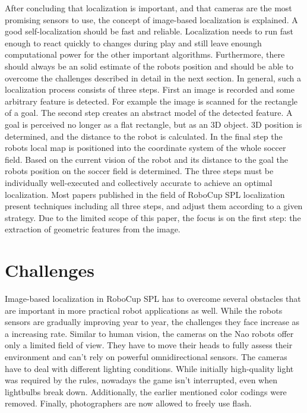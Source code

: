 \documentclass[12pt, a4paper, doc]{apa6}
\begin{document}
  After concluding that localization is important, and that cameras are the most promising sensors to use, the concept of image-based localization is explained. A good self-localization should be fast and reliable. Localization needs to run fast enough to react quickly to changes during play and still leave enoungh computational power for the other important algorithms. Furthermore, there should always be an solid estimate of the robots position and should be able to overcome the challenges described in detail in the next section. In general, such a localization process consists of three steps. First an image is recorded and some arbitrary feature is detected. For example the image is scanned for the rectangle of a goal. The second step creates an abstract model of the detected feature. A goal is perceived no longer as a flat rectangle, but as an 3D object. 3D position is determined, and the distance to the robot is calculated. In the final step the robots local map is positioned into the coordinate system of the whole soccer field. Based on the current vision of the robot and its distance to the goal the robots position on the soccer field is determined. The three steps must be individually well-executed and collectively accurate to achieve an optimal localization. Most papers published in the field of RoboCup SPL localization present techniques including all three steps, and adjust them according to a given strategy. Due to the limited scope of this paper, the focus is on the first step: the extraction of geometric features from the image.

  \section{Challenges}
  Image-based localization in RoboCup SPL has to overcome several obstacles that are important in more practical robot applications as well. While the robots sensors are gradually improving year to year, the challenges they face increase as a increasing rate. Similar to human vision, the cameras on the Nao robots offer only a limited field of view. They have to move their heads to fully assess their environment and can't rely on powerful omnidirectional sensors. The cameras have to deal with different lighting conditions. While initially high-quality light was required by the rules, nowadays the game isn't interrupted, even when lightbulbs break down. Additionally, the earlier mentioned color codings were removed. Finally, photographers are now allowed to freely use flash.
\end{document}
